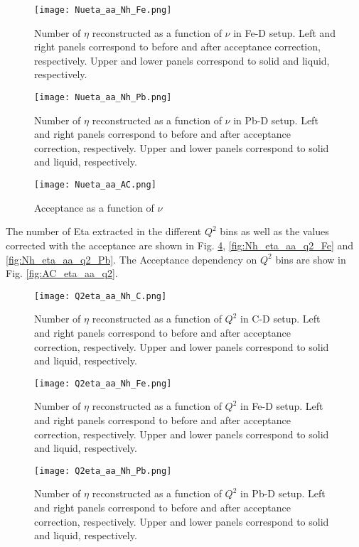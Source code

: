 %
\begin{figure}[H]
\centering
\texttt{[image: Nueta\_aa\_Nh\_Fe.png]}
\caption{Number of $\eta$ reconstructed as a function of $\nu$ in Fe-D setup. Left and right panels correspond to before and after acceptance correction, respectively. Upper and lower panels correspond to solid and liquid, respectively.}
\label{fig::Nh_eta_aa_nu_Fe}
\end{figure}
%
\begin{figure}[H]
\centering
\texttt{[image: Nueta\_aa\_Nh\_Pb.png]}
\caption{Number of $\eta$ reconstructed as a function of $\nu$ in Pb-D setup. Left and right panels correspond to before and after acceptance correction, respectively. Upper and lower panels correspond to solid and liquid, respectively.}
\label{fig::Nh_eta_aa_nu_Pb}
\end{figure}
%
\begin{figure}[H]
\centering
\texttt{[image: Nueta\_aa\_AC.png]}
\caption{Acceptance as a function of $\nu$}
\label{fig:AC_eta_aa_nu}
\end{figure}
%
\clearpage
The number of Eta extracted in the different $Q^2$ bins as well as the values corrected with the acceptance are shown in Fig. \ref{fig:Nh_eta_aa_q2_C}, \ref{fig:Nh_eta_aa_q2_Fe} and \ref{fig:Nh_eta_aa_q2_Pb}. The Acceptance dependency on $Q^2$ bins are show in Fig. \ref{fig:AC_eta_aa_q2}.
\begin{figure}[H]
\centering
\texttt{[image: Q2eta\_aa\_Nh\_C.png]}
\caption{Number of $\eta$ reconstructed as a function of $Q^2$ in C-D setup. Left and right panels correspond to before and after acceptance correction, respectively. Upper and lower panels correspond to solid and liquid, respectively.}
\label{fig:Nh_eta_aa_q2_C}
\end{figure}
%
\begin{figure}[H]
\centering
\texttt{[image: Q2eta\_aa\_Nh\_Fe.png]}
\caption{Number of $\eta$ reconstructed as a function of $Q^2$ in Fe-D setup. Left and right panels correspond to before and after acceptance correction, respectively. Upper and lower panels correspond to solid and liquid, respectively.}
\label{fig::Nh_eta_aa_q2_Fe}
\end{figure}
%
\begin{figure}[H]
\centering
\texttt{[image: Q2eta\_aa\_Nh\_Pb.png]}
\caption{Number of $\eta$ reconstructed as a function of $Q^2$ in Pb-D setup. Left and right panels correspond to before and after acceptance correction, respectively. Upper and lower panels correspond to solid and liquid, respectively.}
\label{fig::Nh_eta_aa_q2_Pb}
\end{figure}
